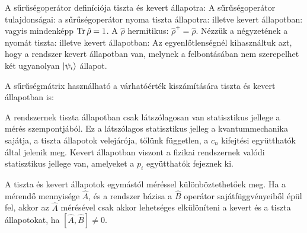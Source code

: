    A sűrűségoperátor definíciója tiszta és kevert állapotra:
   A sűrűségoperátor tulajdonságai: a sűrűségoperátor nyoma tiszta állapotra:
   illetve kevert állapotban:
   vagyis mindenképp $\mathop{\mathrm{Tr}}\nolimits{\hat{\rho}}=1$. A $\hat\rho$ hermitikus: $\hat\rho^+=\hat\rho$. Nézzük a négyzetének a nyomát tiszta:
   illetve kevert állapotban:
   Az egyenlőtlenségnél kihasználtuk azt, hogy a rendszer kevert állapotban van, melynek a felbontásában nem szerepelhet két ugyanolyan $\lvert\psi_i\rangle$ állapot. 
   
   A sűrűségmátrix használható a várhatóérték kiszámítására tiszta és kevert állapotban is:
   
   A rendszernek tiszta állapotban csak látszólagosan van statisztikus jellege a mérés szempontjából. Ez a látszólagos statisztikus jelleg a kvantummechanika sajátja, a tiszta állapotok velejárója, tőlünk független, a $c_n$ kifejtési együtthatók által jelenik meg. Kevert állapotban viszont a fizikai rendszernek valódi statisztikus jellege van, amelyeket a $p_i$ együtthatók fejeznek ki. 
   
   A tiszta és kevert állapotok egymástól méréssel különböztethetőek meg. Ha a mérendő mennyisége $\hat{A}$, és a rendszer bázisa a $\hat B$ operátor sajátfüggvényeiből épül fel, akkor az $\hat A$ mérésével csak akkor lehetséges elkülöníteni a kevert és a tiszta állapotokat, ha $[\hat{A},\hat{B}]\neq 0$.
   
